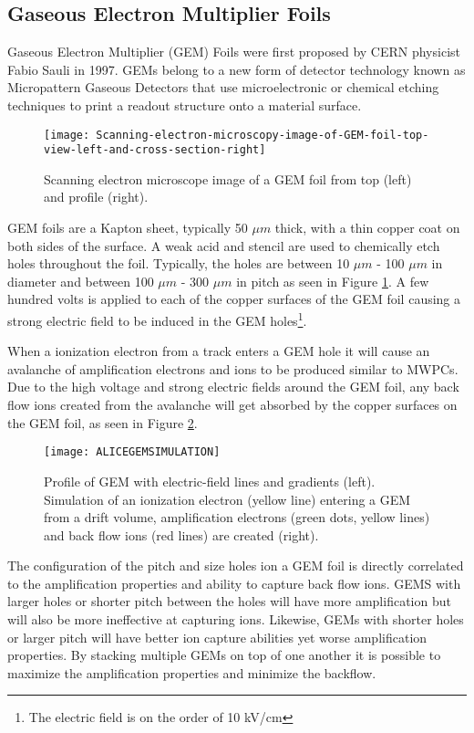 \subsection{Gaseous Electron Multiplier Foils}
Gaseous Electron Multiplier (GEM) Foils were first proposed by CERN physicist Fabio Sauli in 1997\cite{Sauli:1997qp}.  GEMs belong to a new form of detector technology known as Micropattern Gaseous Detectors\cite{Titov:2013hmq} that use microelectronic or chemical etching techniques to print a readout structure onto a material surface.

\begin{figure}[h]
\texttt{[image: Scanning-electron-microscopy-image-of-GEM-foil-top-view-left-and-cross-section-right]}
\centering
\caption{Scanning electron microscope image of a GEM foil from top (left) and profile (right)\cite{Brucken:2017qjy}.}
\label{fig:GEMpic}
\end{figure}

\noindent
GEM foils are a Kapton sheet, typically 50 $\mu m$ thick, with a thin copper coat on both sides of the surface.  A weak acid and stencil are used to chemically etch holes throughout the foil.  Typically, the holes are between 10 $\mu m$ - 100 $\mu m$ in diameter and between 100 $\mu m$ - 300 $\mu m$ in pitch as seen in Figure \ref{fig:GEMpic}.  A few hundred volts is applied to each of the copper surfaces of the GEM foil causing a strong electric field to be induced in the GEM holes\footnote{The electric field is on the order of 10 kV/cm}.  

When a ionization electron from a track enters a GEM hole it will cause an avalanche of amplification electrons and ions to be produced similar to MWPCs.  Due to the high voltage and strong electric fields around the GEM foil, any back flow ions created from the avalanche will get absorbed by the copper surfaces on the GEM foil, as seen in Figure \ref{fig:GEMefield}.
\begin{figure}[h]
\texttt{[image: ALICEGEMSIMULATION]}
\centering
\caption{Profile of GEM with electric-field lines and gradients (left).  Simulation of an ionization electron (yellow line) entering a GEM from a drift volume, amplification electrons (green dots, yellow lines) and back flow ions (red lines) are created (right)\cite{Bhattacharya:2017yaj}.}
\label{fig:GEMefield}
\end{figure}

\noindent
The configuration of the pitch and size holes ion a GEM foil is directly correlated to the amplification properties and ability to capture back flow ions.  GEMS with larger holes or shorter pitch between the holes will have more amplification but will also be more ineffective at capturing ions.  Likewise, GEMs with shorter holes or larger pitch will have better ion capture abilities yet worse amplification properties.  By stacking multiple GEMs on top of one another it is possible to maximize the amplification properties and minimize the backflow. 

